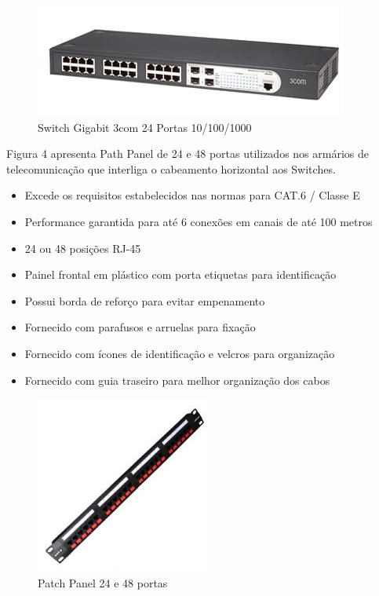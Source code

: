 \documentclass[	DIV=calc,%
							paper=a4,%
							fontsize=12pt,%
							onecolumn]{scrartcl}	 					%
\begin{document}
\begin{figure}
	\centering
	\includegraphics[]{sw24}
	\caption{Switch Gigabit 3com 24 Portas 10/100/1000 }
	\label{fig3}
\end{figure}


Figura 4 apresenta Path Panel de 24 e 48 portas utilizados nos armários de telecomunicação que interliga o cabeamento horizontal aos Switches.
\begin{itemize}
\item Excede os requisitos estabelecidos nas normas para CAT.6 / Classe E
\item Performance garantida para até 6 conexões em canais de até 100 metros
\item 24 ou 48 posições RJ-45
\item Painel frontal em plástico com porta etiquetas para identificação
\item Possui borda de reforço para evitar empenamento 
\item Fornecido com parafusos e arruelas para fixação
\item Fornecido com ícones de identificação e velcros para organização
\item Fornecido com guia traseiro para melhor organização dos cabos
\end{itemize}

\begin{figure}
	\centering
	\includegraphics[]{pp2448}
	\caption{Patch Panel 24 e 48 portas}
	\label{fig4}
\end{figure}
\end{document}
